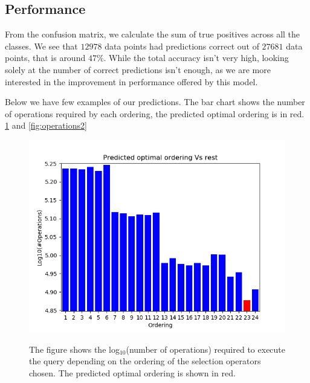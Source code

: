 \subsection{Performance}
From the confusion matrix, we calculate the sum of true positives across all the classes. We see that $12978$ data points had predictions correct out of $27681$ data points, that is around $47\%$. While the total accuracy isn't very high, looking solely at the number of correct predictions isn't enough, as we are more interested in the improvement in performance offered by this model.
\par Below we have few examples of our predictions. The bar chart shows the number of operations required by each ordering, the predicted optimal ordering is in red. \ref{fig:operations1} and \ref{fig:operations2}

\begin{figure}
\centering
\includegraphics[scale=0.8]{operations1.png}\\
\caption{The figure shows the log$_{10}$(number of operations) required to execute the query depending on the ordering of the selection operators chosen. The predicted optimal ordering is shown in red.}
\label{fig:operations1}
\end{figure}

